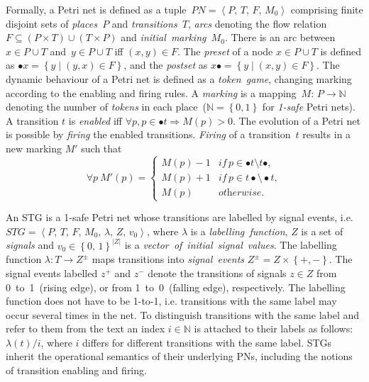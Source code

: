 \documentclass[british, journal]{IEEEtran}
\begin{document}
Formally, a Petri net is defined as a tuple~$PN=\left\langle P,\, T,\, F,\, M_{0}\right\rangle $
comprising finite disjoint sets of \emph{places~}$P$ and \emph{transitions~}$T$,
\emph{arcs} denoting the flow relation~$F\subseteq\left(P\times T\right)\cup\left(T\times P\right)$
and \emph{initial~marking~}$M_{0}$. There is an arc between~$x\in P\cup T$
and~$y\in P\cup T$ iff $\left(x,y\right)\in F$. The \emph{preset}
of a node $x\in P\cup T$ is defined as $\bullet x=\left\{ y\mid\left(y,x\right)\in F\right\} $,
and the \emph{postset} as $x\bullet=\left\{ y\mid\left(x,y\right)\in F\right\} $.
The dynamic behaviour of a Petri net is defined as a \emph{token~game},
changing marking according to the enabling and firing rules. A \emph{marking}
is a mapping~$M:\, P\rightarrow\mathbb{N}$ denoting the number of
\emph{tokens} in each place~($\mathbb{N}=\left\{ 0,1\right\} $ for
\emph{1-safe} Petri nets). A transition $t$ is \emph{enabled} iff
$\forall p,p\in\bullet t\Rightarrow M(p)>0$. The evolution of a Petri
net is possible by \emph{firing} the enabled transitions. \emph{Firing}
of a transition~$t$ results in a new marking $M'$ such that
\[
\forall p~M'(p)=\left\{ \begin{array}{ll}
M(p)-1 & \textit{if}\, p\in\bullet t\setminus t\bullet,\\
M(p)+1 & \textit{if}\, p\in t\bullet\setminus\bullet t,\\
M(p)\,\,\,\,\, & \textit{otherwise}.
\end{array}\right.
\]

An STG is a 1-safe Petri net whose transitions are labelled by signal
events, i.e. $STG=\left\langle P,\, T,\, F,\, M_{0},\,\lambda,\, Z,\, v_{0}\right\rangle $,
where $\lambda$ is a \emph{labelling~function}, $Z$ is a set of
\emph{signals} and $v_{0}\in\left\{ 0,\,1\right\} ^{\left|Z\right|}$
is a \emph{vector~of}~\emph{initial~signal~values}. The labelling
function $\lambda:T\rightarrow Z^{\pm}$ maps transitions into \emph{signal~events}
$Z^{\pm}=Z\times\left\{+,-\right\}$. The signal events labelled $z^{+}$
and $z^{-}$ denote the transitions of signals $z\in Z$ from 0~to~1~(rising
edge), or from 1~to~0~(falling edge), respectively. The labelling
function does not have to be 1-to-1, i.e. transitions with the same
label may occur several times in the net. To distinguish transitions
with the same label and refer to them from the text an index $i\in\mathbb{N}$
is attached to their labels as follows: $\lambda\left(t\right)/i$,
where $i$ differs for different transitions with the same label.
STGs inherit the operational semantics of their underlying PNs, including
the notions of transition enabling and firing.
\end{document}

